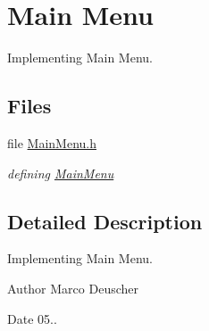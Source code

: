 \hypertarget{group__MainMenu}{}\section{Main Menu}
\label{group__MainMenu}


Implementing Main Menu.  


\subsection*{Files}
\begin{DoxyCompactItemize}
\item 
file \hyperlink{MainMenu_8h}{Main\+Menu.\+h}
\begin{DoxyCompactList}\small\item\em defining \hyperlink{classMainMenu}{Main\+Menu} \end{DoxyCompactList}\end{DoxyCompactItemize}


\subsection{Detailed Description}
Implementing Main Menu. 

\begin{DoxyAuthor}{Author}
Marco Deuscher 
\end{DoxyAuthor}
\begin{DoxyDate}{Date}
05.. 
\end{DoxyDate}
